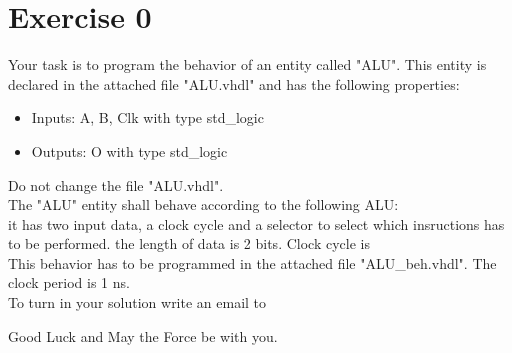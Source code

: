 \documentclass[a4paper,12pt]{article}
\begin{document}
\pagestyle{empty}
\setlength{\parindent}{0em} 
\section*{Exercise 0}

Your task is to program the behavior of an entity called "ALU". This entity is declared in the attached file "ALU.vhdl" and has the following properties:
\begin{itemize}
\item Inputs:  A, B, Clk with type std\_logic
\item Outputs: O with type std\_logic
\end{itemize}

Do not change the file "ALU.vhdl".
\\

The "ALU" entity shall behave according to the following ALU:
\\
it has two input data, a clock cycle and a selector to select which insructions has to be performed. the length of data is 2 bits. Clock cycle is %
\\
This behavior has to be programmed in the attached file "ALU\_beh.vhdl". The clock period is 1 ns.
\\

To turn in your solution write an email to %

\vspace{0.7cm}
Good Luck and May the Force be with you.
\end{document}
